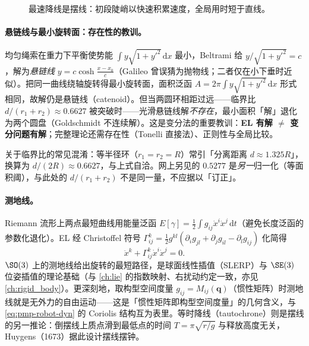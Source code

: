 \begin{figure}[ht]
\centering
{}
\caption{最速降线是摆线：初段陡峭以快速积累速度，全局用时短于直线。}
\label{fig:pmp-cycloid}
\end{figure}

\paragraph{悬链线与最小旋转面：存在性的教训。}
均匀绳索在重力下平衡使势能 $\int y\sqrt{1+y'^2}\,\mathrm dx$ 最小，Beltrami 给 $y/\sqrt{1+y'^2}=c$，解为\emph{悬链线} $y=c\cosh\!\frac{x-x_0}{c}$（Galileo 曾误猜为抛物线；二者仅在小下垂时近似）。把同一曲线绕轴旋转得最小旋转面，面积泛函 $A=2\pi\int y\sqrt{1+y'^2}\,\mathrm dx$ 形式相同，故解仍是悬链线（catenoid）。但当两圆环相距过远——临界比 $d/(r_1+r_2)\approx 0.6627$ 被突破时——光滑悬链线解\emph{不存在}，最小面积「解」退化为两个圆盘（Goldschmidt 不连续解）。这是变分法的重要教训：\textbf{EL 有解 $\ne$ 变分问题有解}；完整理论还需存在性（Tonelli 直接法）、正则性与全局比较。

\begin{note}
关于临界比的常见混淆：等半径环（$r_1=r_2=R$）常引「分离距离 $d\approx 1.325R$」，换算为 $d/(2R)\approx 0.6627$，与上式自洽。网上另见的 $0.5277$ 是\emph{另一}归一化（等面积阈），与此处的 $d/(r_1+r_2)$ 不是同一量，不应据以「订正」。
\end{note}

\paragraph{测地线。}
Riemann 流形上两点最短曲线用能量泛函 $E[\gamma]=\tfrac12\int g_{ij}\dot x^i\dot x^j\,\mathrm dt$（避免长度泛函的参数化退化）。EL 经 Christoffel 符号 $\Gamma^k_{ij}=\tfrac12 g^{kl}(\partial_ig_{jl}+\partial_jg_{il}-\partial_lg_{ij})$ 化简得
\begin{equation}
  \ddot x^k+\Gamma^k_{ij}\dot x^i\dot x^j=0.
  \label{eq:pmp-geodesic}
\end{equation}
$\SO(3)$ 上的测地线给出旋转的最短路径，是球面线性插值（SLERP）与 $\SE(3)$ 位姿插值的理论基础（与 \cref{ch:lie} 的指数映射、右扰动约定一致，亦见 \cref{ch:rigid_body}）。更深刻地，取构型空间度量 $g_{ij}=M_{ij}(\mathbf q)$（惯性矩阵）时测地线就是无外力的自由运动——这是「惯性矩阵即构型空间度量」的几何含义，与 \cref{eq:pmp-robot-dyn} 的 Coriolis 结构互为表里。等时降线（tautochrone）则是摆线的另一推论：倒摆线上质点滑到最低点的时间 $T=\pi\sqrt{r/g}$ 与释放高度无关，Huygens（1673）据此设计摆线摆钟。

